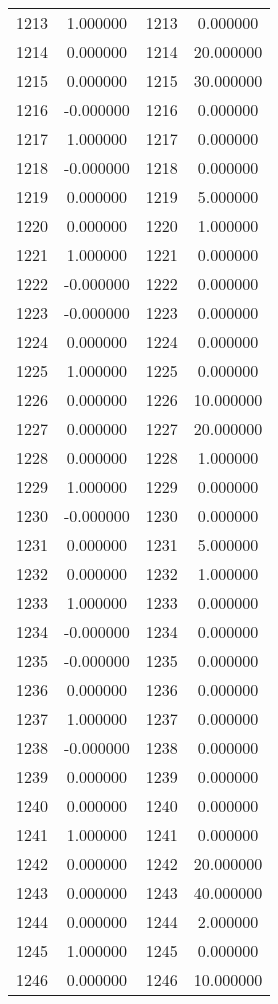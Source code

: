 \documentclass[12pt]{article}
\begin{document}
\begin{longtable}{@{}cccc@{}}
1213 & 1.000000 & 1213 & 0.000000 \\
1214 & 0.000000 & 1214 & 20.000000 \\
1215 & 0.000000 & 1215 & 30.000000 \\
1216 & -0.000000 & 1216 & 0.000000 \\
1217 & 1.000000 & 1217 & 0.000000 \\
1218 & -0.000000 & 1218 & 0.000000 \\
1219 & 0.000000 & 1219 & 5.000000 \\
1220 & 0.000000 & 1220 & 1.000000 \\
1221 & 1.000000 & 1221 & 0.000000 \\
1222 & -0.000000 & 1222 & 0.000000 \\
1223 & -0.000000 & 1223 & 0.000000 \\
1224 & 0.000000 & 1224 & 0.000000 \\
1225 & 1.000000 & 1225 & 0.000000 \\
1226 & 0.000000 & 1226 & 10.000000 \\
1227 & 0.000000 & 1227 & 20.000000 \\
1228 & 0.000000 & 1228 & 1.000000 \\
1229 & 1.000000 & 1229 & 0.000000 \\
1230 & -0.000000 & 1230 & 0.000000 \\
1231 & 0.000000 & 1231 & 5.000000 \\
1232 & 0.000000 & 1232 & 1.000000 \\
1233 & 1.000000 & 1233 & 0.000000 \\
1234 & -0.000000 & 1234 & 0.000000 \\
1235 & -0.000000 & 1235 & 0.000000 \\
1236 & 0.000000 & 1236 & 0.000000 \\
1237 & 1.000000 & 1237 & 0.000000 \\
1238 & -0.000000 & 1238 & 0.000000 \\
1239 & 0.000000 & 1239 & 0.000000 \\
1240 & 0.000000 & 1240 & 0.000000 \\
1241 & 1.000000 & 1241 & 0.000000 \\
1242 & 0.000000 & 1242 & 20.000000 \\
1243 & 0.000000 & 1243 & 40.000000 \\
1244 & 0.000000 & 1244 & 2.000000 \\
1245 & 1.000000 & 1245 & 0.000000 \\
1246 & 0.000000 & 1246 & 10.000000 \\

\end{longtable}
\end{document}
